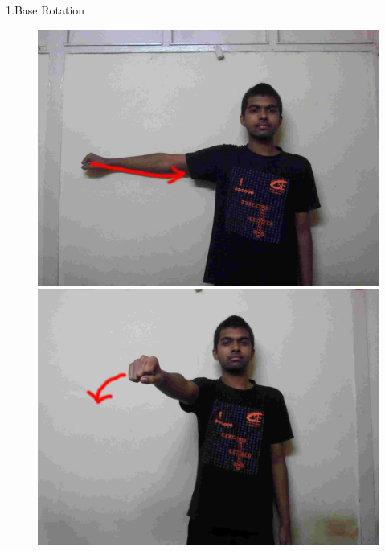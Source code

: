 \documentclass{beamer}
\begin{document}
\begin{frame}{1.Base Rotation}
  \begin{figure}
      \centering
      \includegraphics[scale = .06]{gestures/11.jpg} 
      \includegraphics[scale = .06]{gestures/12.jpg} 
  \end{figure}
\end{frame}
\end{document}
